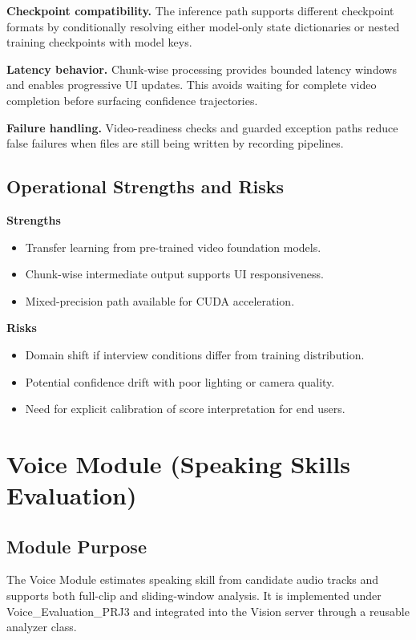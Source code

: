 \documentclass[12pt,a4paper]{report}
\begin{document}
\textbf{Checkpoint compatibility.} The inference path supports different checkpoint formats by conditionally resolving either model-only state dictionaries or nested training checkpoints with model keys.

\textbf{Latency behavior.} Chunk-wise processing provides bounded latency windows and enables progressive UI updates. This avoids waiting for complete video completion before surfacing confidence trajectories.

\textbf{Failure handling.} Video-readiness checks and guarded exception paths reduce false failures when files are still being written by recording pipelines.

\section{Operational Strengths and Risks}
\textbf{Strengths}
\begin{itemize}[leftmargin=1.5em]
\item Transfer learning from pre-trained video foundation models.
\item Chunk-wise intermediate output supports UI responsiveness.
\item Mixed-precision path available for CUDA acceleration.
\end{itemize}

\textbf{Risks}
\begin{itemize}[leftmargin=1.5em]
\item Domain shift if interview conditions differ from training distribution.
\item Potential confidence drift with poor lighting or camera quality.
\item Need for explicit calibration of score interpretation for end users.
\end{itemize}

\chapter{Voice Module (Speaking Skills Evaluation)}
\section{Module Purpose}
The Voice Module estimates speaking skill from candidate audio tracks and supports both full-clip and sliding-window analysis. It is implemented under Voice\_Evaluation\_PRJ3 and integrated into the Vision server through a reusable analyzer class.
\end{document}
